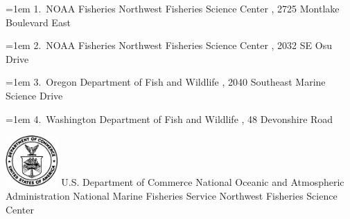\documentclass[
]{scrartcl}
\begin{document}
\begin{titlepage}
\begin{minipage}[b][\textheight][s]{\textwidth}
  \hangindent=1em
  {1}.~{NOAA Fisheries Northwest Fisheries Science Center}%
  , %
  {2725 Montlake Boulevard East}%
  \par\hangindent=1em%
  {2}.~{NOAA Fisheries Northwest Fisheries Science Center}%
  , %
  {2032 SE Osu Drive}%
  \par\hangindent=1em%
  {3}.~{Oregon Department of Fish and Wildlife}%
  , %
  {2040 Southeast Marine Science Drive}%
  \par\hangindent=1em%
  {4}.~{Washington Department of Fish and Wildlife}%
  , %
  {48 Devonshire Road}%


  \vspace{1\baselineskip}



  \vfill


  \vspace{1\baselineskip}

  \includegraphics[alt={},width=2cm]{support_files/us_doc_logo.png}\newline %
  U.S. Department of Commerce\newline
  National Oceanic and Atmospheric Administration\newline
  National Marine Fisheries Service\newline
  Northwest Fisheries Science Center\newline

  \end{minipage}
  \restoregeometry
  \end{titlepage}
\end{document}

